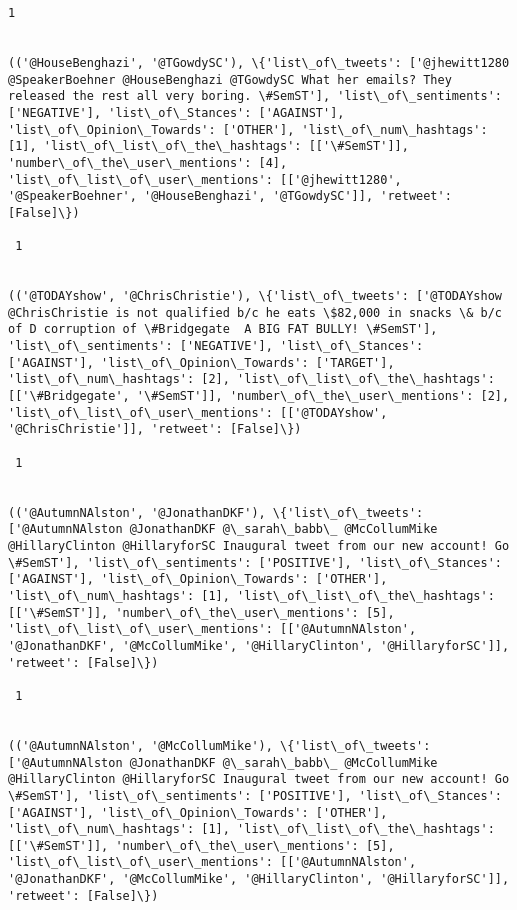 \documentclass[11pt]{article}
\begin{document}
\begin{Verbatim}[commandchars=\\\{\}]
 1
 

(('@HouseBenghazi', '@TGowdySC'), \{'list\_of\_tweets': ['@jhewitt1280 @SpeakerBoehner @HouseBenghazi @TGowdySC What her emails? They released the rest all very boring. \#SemST'], 'list\_of\_sentiments': ['NEGATIVE'], 'list\_of\_Stances': ['AGAINST'], 'list\_of\_Opinion\_Towards': ['OTHER'], 'list\_of\_num\_hashtags': [1], 'list\_of\_list\_of\_the\_hashtags': [['\#SemST']], 'number\_of\_the\_user\_mentions': [4], 'list\_of\_list\_of\_user\_mentions': [['@jhewitt1280', '@SpeakerBoehner', '@HouseBenghazi', '@TGowdySC']], 'retweet': [False]\})

 1
 

(('@TODAYshow', '@ChrisChristie'), \{'list\_of\_tweets': ['@TODAYshow @ChrisChristie is not qualified b/c he eats \$82,000 in snacks \& b/c of D corruption of \#Bridgegate  A BIG FAT BULLY! \#SemST'], 'list\_of\_sentiments': ['NEGATIVE'], 'list\_of\_Stances': ['AGAINST'], 'list\_of\_Opinion\_Towards': ['TARGET'], 'list\_of\_num\_hashtags': [2], 'list\_of\_list\_of\_the\_hashtags': [['\#Bridgegate', '\#SemST']], 'number\_of\_the\_user\_mentions': [2], 'list\_of\_list\_of\_user\_mentions': [['@TODAYshow', '@ChrisChristie']], 'retweet': [False]\})

 1
 

(('@AutumnNAlston', '@JonathanDKF'), \{'list\_of\_tweets': ['@AutumnNAlston @JonathanDKF @\_sarah\_babb\_ @McCollumMike @HillaryClinton @HillaryforSC Inaugural tweet from our new account! Go \#SemST'], 'list\_of\_sentiments': ['POSITIVE'], 'list\_of\_Stances': ['AGAINST'], 'list\_of\_Opinion\_Towards': ['OTHER'], 'list\_of\_num\_hashtags': [1], 'list\_of\_list\_of\_the\_hashtags': [['\#SemST']], 'number\_of\_the\_user\_mentions': [5], 'list\_of\_list\_of\_user\_mentions': [['@AutumnNAlston', '@JonathanDKF', '@McCollumMike', '@HillaryClinton', '@HillaryforSC']], 'retweet': [False]\})

 1
 

(('@AutumnNAlston', '@McCollumMike'), \{'list\_of\_tweets': ['@AutumnNAlston @JonathanDKF @\_sarah\_babb\_ @McCollumMike @HillaryClinton @HillaryforSC Inaugural tweet from our new account! Go \#SemST'], 'list\_of\_sentiments': ['POSITIVE'], 'list\_of\_Stances': ['AGAINST'], 'list\_of\_Opinion\_Towards': ['OTHER'], 'list\_of\_num\_hashtags': [1], 'list\_of\_list\_of\_the\_hashtags': [['\#SemST']], 'number\_of\_the\_user\_mentions': [5], 'list\_of\_list\_of\_user\_mentions': [['@AutumnNAlston', '@JonathanDKF', '@McCollumMike', '@HillaryClinton', '@HillaryforSC']], 'retweet': [False]\})


\end{Verbatim}
\end{document}
